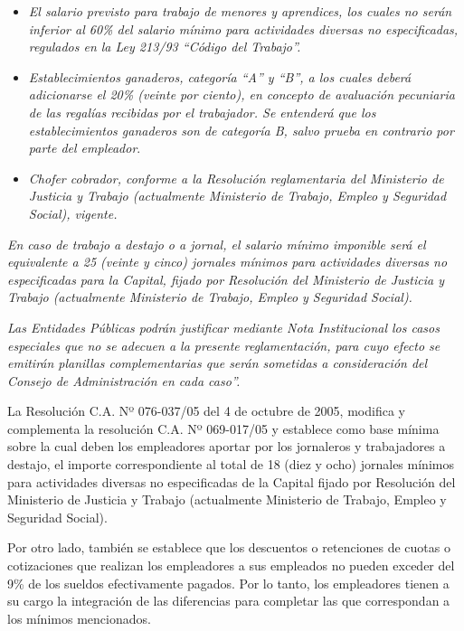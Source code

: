 \begin {itemize}

\item\textit{El salario previsto para trabajo de menores y aprendices, los cuales no serán inferior al 60\% del salario mínimo para actividades diversas no especificadas, regulados en la Ley 213/93 “Código del Trabajo”.}

\item\textit{Establecimientos ganaderos, categoría “A” y “B”, a los cuales deberá adicionarse el 20\% (veinte por ciento), en concepto de avaluación pecuniaria de las regalías recibidas por el trabajador. Se entenderá que los establecimientos ganaderos son de categoría B, salvo prueba en contrario por parte del empleador}.

\item\textit{Chofer cobrador, conforme a la Resolución reglamentaria del Ministerio de Justicia y Trabajo (actualmente Ministerio de Trabajo, Empleo y Seguridad Social), vigente.}

\end{itemize}

\textit{En caso de trabajo a destajo o a jornal, el salario mínimo imponible será el equivalente a 25 (veinte y cinco) jornales mínimos para actividades diversas no especificadas para la Capital, fijado por Resolución del Ministerio de Justicia y Trabajo (actualmente Ministerio de Trabajo, Empleo y Seguridad Social).}

\textit{Las Entidades Públicas podrán justificar mediante Nota Institucional los casos especiales que no se adecuen a la presente reglamentación, para cuyo efecto se emitirán planillas complementarias que serán sometidas a consideración del Consejo de Administración en cada caso”.}

La Resolución C.A. Nº 076-037/05 del 4 de octubre de 2005, modifica y complementa la resolución C.A. Nº 069-017/05 y establece como base mínima sobre la cual deben los empleadores aportar por los jornaleros y trabajadores a destajo, el importe correspondiente al total de 18 (diez y ocho) jornales mínimos para actividades diversas no especificadas de la Capital fijado por Resolución del Ministerio de Justicia y Trabajo (actualmente Ministerio de Trabajo, Empleo y Seguridad Social).

Por otro lado, también se establece que los descuentos o retenciones de cuotas o cotizaciones que realizan los empleadores a sus empleados no pueden exceder del 9\% de los sueldos efectivamente pagados. Por lo tanto, los empleadores tienen a su cargo la integración de las diferencias para completar las que correspondan a los mínimos mencionados.

